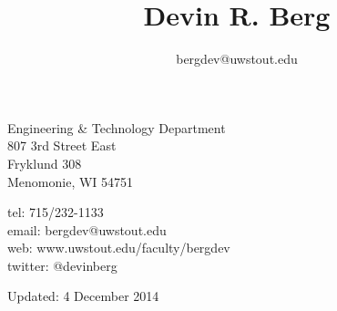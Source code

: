 \documentclass[10pt]{article}
\title{\bfseries\Huge Devin R. Berg}
\author{bergdev@uwstout.edu}
\date{}
\begin{document}
\maketitle
\vspace{1em}
\begin{minipage}[ht]{0.48\textwidth}
Engineering \& Technology Department\\
807 3rd Street East\\
Fryklund 308\\
Menomonie, WI 54751
\end{minipage}
\begin{minipage}[ht]{0.48\textwidth}
\begin{flushright}
tel: 715/232-1133\\
email: bergdev@uwstout.edu\\
web: www.uwstout.edu/faculty/bergdev\\
twitter: @devinberg
\end{flushright}
\end{minipage}
\vspace{20pt}


















































\vspace{20pt}
\vspace{20pt}
\scriptsize\hfill Updated: 4 December 2014
\end{document}

